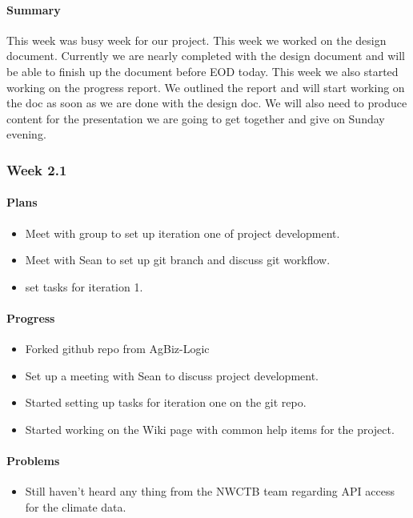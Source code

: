 \documentclass[onecolumn, draftclsnofoot,10pt, compsoc]{article}
\begin{document}
		      \paragraph{Summary} \hfill \break
		        This week was busy week for our project. This week we worked on the design document. Currently we are nearly completed with the design document and will be able to finish up the document before EOD today. This week we also started working on the progress report. We outlined the report and will start working on the doc as soon as we are done with the design doc. We will also need to produce content for the presentation we are going to get together and give on Sunday evening.\\

		  \subsubsection{Week 2.1}
			\paragraph{Plans} \hfill \break
				\begin{itemize}
					\item Meet with group to set up iteration one of project development.
					\item Meet with Sean to set up git branch and discuss git workflow.
					\item set tasks for iteration 1.
				\end{itemize}

			\paragraph{Progress} \hfill \break
				\begin{itemize}
					\item Forked github repo from AgBiz-Logic
					\item Set up a meeting with Sean to discuss project development.
					\item Started setting up tasks for iteration one on the git repo.
					\item Started working on the Wiki page with common help items for the project.
				\end{itemize}
			\paragraph{Problems} \hfill \break
				\begin{itemize}
					\item Still haven't heard any thing from the NWCTB team regarding API access for the climate data.
				\end{itemize}
\end{document}
